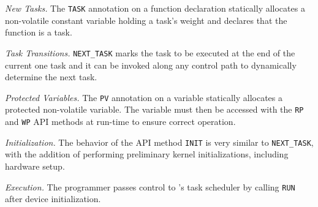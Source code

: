 
\noindent\textit{New Tasks.} The \texttt{TASK} annotation on a function
declaration statically allocates a non-volatile constant variable holding a
task's weight and declares that the function is a task.

\noindent\textit{Task Transitions.} \texttt{NEXT\_TASK} marks the task to be executed at the 
end of the current one task and it can be invoked along
any control path to dynamically determine the next task.

\noindent\textit{Protected Variables.} The \texttt{PV} annotation on a
variable statically allocates a protected non-volatile variable. The
variable must then be accessed with the \texttt{RP} and \texttt{WP} API methods at
run-time to ensure correct operation.

\noindent\textit{Initialization.} The behavior of the API method
\texttt{INIT} is very similar to \texttt{NEXT\_TASK}, with the
addition of performing preliminary kernel initializations, including hardware setup.

\noindent\textit{Execution.} The programmer passes control to \sys's task scheduler 
by calling \texttt{RUN} after device initialization. 

